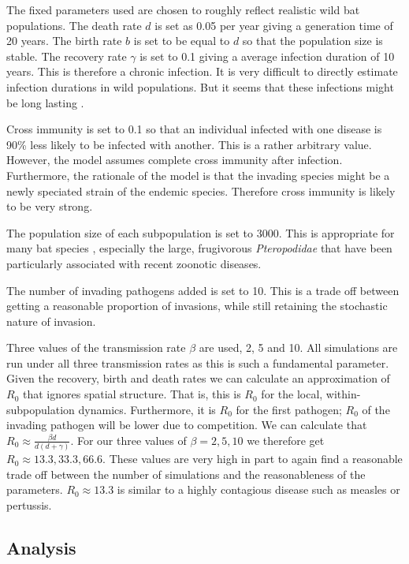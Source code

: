 The fixed parameters used are chosen to roughly reflect realistic wild bat populations. 
The death rate $d$ is set as 0.05 per year giving a generation time of 20 years.
The birth rate $b$ is set to be equal to $d$ so that the population size is stable.
The recovery rate $\gamma$ is set to 0.1 giving a average infection duration of 10 years. 
This is therefore a chronic infection. 
It is very difficult to directly estimate infection durations in wild populations.
But it seems that these infections might be long lasting \cite{}.

Cross immunity is set to 0.1 so that an individual infected with one disease is 90\% less likely to be infected with another.
This is a rather arbitrary value.
However, the model assumes complete cross immunity after infection.
Furthermore, the rationale of the model is that the invading species might be a newly speciated strain of the endemic species.
Therefore cross immunity is likely to be very strong.

The population size of each subpopulation is set to 3000. 
This is appropriate for many bat species \cite{jones2009pantheria}, especially the large, frugivorous \emph{Pteropodidae} that have been particularly associated with recent zoonotic diseases.

The number of invading pathogens added is set to 10. 
This is a trade off between getting a reasonable proportion of invasions, while still retaining the stochastic nature of invasion.

Three values of the transmission rate $\beta$ are used, 2, 5 and 10.
All simulations are run under all three transmission rates as this is such a fundamental parameter.
Given the recovery, birth and death rates we can calculate an approximation of $R_0$ that ignores spatial structure.
That is, this is $R_0$ for the local, within-subpopulation dynamics.
Furthermore, it is $R_0$ for the first pathogen; $R_0$ of the invading pathogen will be lower due to competition.
We can calculate that $R_0 \approx \frac{\beta d}{d(d+ \gamma)}$.
For our three values of $\beta = 2, 5, 10$ we therefore get $R_0 \approx 13.3, 33.3, 66.6$.
These values are very high in part to again find a reasonable trade off between the number of simulations and the reasonableness of the parameters.
$R_0 \approx 13.3$ is similar to a highly contagious disease such as measles or pertussis. 


\subsection{Analysis}


